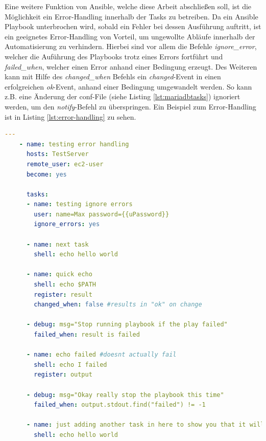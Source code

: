 \documentclass[biblatex]{lni}
\begin{document}
Eine weitere Funktion von Ansible, welche diese Arbeit abschließen soll, ist die Möglichkeit ein Error-Handling innerhalb der Tasks zu betreiben. Da ein Ansible Playbook unterbrochen wird, sobald ein Fehler bei dessen Ausführung auftritt, ist ein geeignetes Error-Handling von Vorteil, um ungewollte Abläufe innerhalb der Automatisierung zu verhindern. Hierbei sind vor allem die Befehle \textit{ignore\_error}, welcher die Auführung des Playbooks trotz eines Errors fortführt und \textit{failed\_when}, welcher einen Error anhand einer Bedingung erzeugt. Des Weiteren kann mit Hilfe des \textit{changed\_when} Befehls ein \textit{changed}-Event in einen erfolgreichen \textit{ok}-Event, anhand einer Bedingung umgewandelt werden. So kann z.B. eine Änderung der conf-File (siehe Listing \ref{lst:mariadbtasks}) ignoriert werden, um den \textit{notify}-Befehl zu überspringen. Ein Beispiel zum Error-Handling ist in Listing \ref{lst:error-handling} zu sehen.
\begin{lstlisting}[language=yaml, caption={Ansible Beispiel Task mit Error-Handling}, label=lst:error-handling]
    ---
    - name: testing error handling
      hosts: TestServer
      remote_user: ec2-user
      become: yes
    
      tasks:
      - name: testing ignore errors
        user: name=Max password={{uPassword}}
        ignore_errors: yes
    
      - name: next task
        shell: echo hello world
    
      - name: quick echo
        shell: echo $PATH
        register: result
        changed_when: false #results in "ok" on change
    
      - debug: msg="Stop running playbook if the play failed"
        failed_when: result is failed
    
      - name: echo failed #doesnt actually fail
        shell: echo I failed
        register: output
    
      - debug: msg="Okay really stop the playbook this time"
        failed_when: output.stdout.find("failed") != -1
    
      - name: just adding another task in here to show you that it will stop
        shell: echo hello world
\end{lstlisting}

\newpage
\printbibliography %
\end{document}
